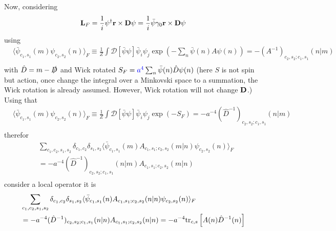 Now, considering
\begin{equation}
\begin{split}
&{\bf L}_F=\frac{1}{i}\psi^{\dagger}{\bf r}\times {\bf D}\psi=\frac{1}{i}\bar{\psi}\gamma _0{\bf r}\times {\bf D}\psi\\
\end{split}
\end{equation}
using
\begin{equation}
\begin{split}
&\langle \bar{\psi}_{c_1,s_1}(m) \psi _{c_2,s_2}(n) \rangle _F \equiv \frac{1}{Z}\int \mathcal{D}[\bar{\psi}\psi ]\bar{\psi}_i \psi _j \exp(-\sum _n \bar{\psi}(n)A\psi (n) )=-(A^{-1})_{c_2,s_2;c_1,s_1}(n|m)\\
\end{split}
\end{equation}
with $\hat{D}=m-\slashed {D}$ and Wick rotated $S_F=\textcolor[rgb]{0,0,1}{a^4}\sum _n\bar{\psi}(n)\hat{D}\psi(n)$ (here $S$ is not spin but action, once change the integral over a Minkovski space to a summation, the Wick rotation is already assumed. However, Wick rotation will not change ${\bf D}$.) Using that
\begin{equation}
\begin{split}
&\langle \bar{\psi}_{c_1,s_1}(m) \psi _{c_2,s_2}(n) \rangle _F \equiv \frac{1}{Z}\int \mathcal{D}[\bar{\psi}\psi ]\bar{\psi}_i \psi _j \exp(-S_F)=-a^{-4}(\hat{D}^{-1})_{c_2,s_2;c_1,s_1}(n|m)\\
\end{split}
\end{equation}
therefor
\begin{equation}
\begin{split}
&\sum _{c_1,c_2,s_1,s_2}\delta _{c_1,c_2}\delta _{s_1,s_2}\langle \bar{\psi}_{c_1,s_1}(m) A_{c_1,s_1;c_2,s_2}(m|n) \psi _{c_2,s_2}(n) \rangle _F \\
&=-a^{-4}(\hat{D}^{-1})_{c_2,s_2;c_1,s_1}(n|m)A_{c_1,s_1;c_2,s_2}(m|n)\\
\end{split}
\end{equation}
consider a local operator it is
\begin{equation}
\begin{split}
&\sum _{c_1,c_2,s_1,s_2}\delta _{c_1,c_2}\delta _{s_1,s_2}\langle \bar{\psi}_{c_1,s_1}(n) A_{c_1,s_1;c_2,s_2}(n|n) \psi _{c_2,s_2}(n) \rangle _F \\
&=-a^{-4}(\hat{D}^{-1})_{c_2,s_2;c_1,s_1}(n|n)A_{c_1,s_1;c_2,s_2}(n|n)=-a^{-4}{\rm tr}_{c,s}\left[A(n)\hat{D}^{-1}(n)\right]\\
\end{split}
\end{equation}

